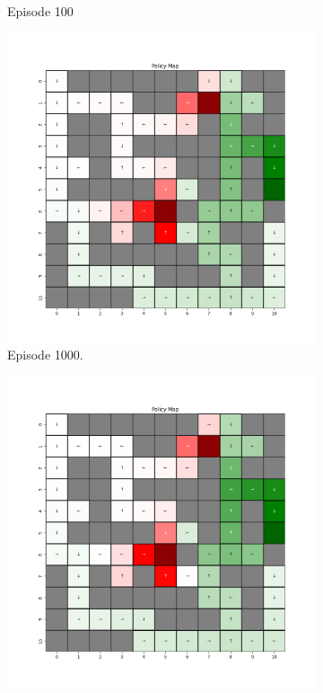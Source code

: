 \documentclass{assignment}
\begin{document}
\begin{figure}[H]
\begin{subfigure}{0.3\textwidth}
    \caption{Episode 100}
    \end{subfigure}
    \begin{subfigure}{0.3\textwidth}
        \includegraphics[width=\textwidth]{figures/policy_td/alpha_sweep/policy_alpha_0.1_gamma_0.95_epsilon_0.2_iteration_1000.png}
    \caption{Episode 1000.}
    \end{subfigure}\hfill
    \begin{subfigure}{0.3\textwidth}
        \includegraphics[width=\textwidth]{figures/policy_td/alpha_sweep/policy_alpha_0.1_gamma_0.95_epsilon_0.2_iteration_5000.png}

\end{subfigure}
\end{figure}
\end{document}
